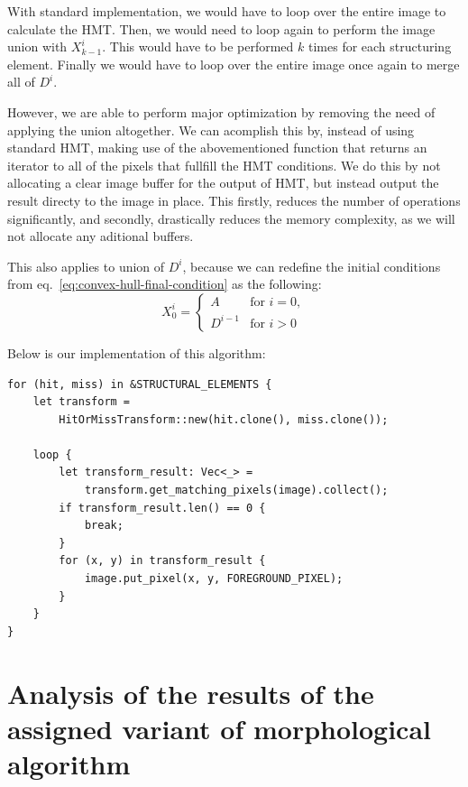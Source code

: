 \documentclass[12pt]{article}
\begin{document}
With standard implementation, we would have to loop over the entire image to calculate the HMT.
Then, we would need to loop again to perform the image union with $X^i_{k-1}$.
This would have to be performed $k$ times for each structuring element.
Finally we would have to loop over the entire image once again to merge all of $D^i$.

However, we are able to perform major optimization by removing the need of applying the union altogether.
We can acomplish this by, instead of using standard HMT, making use of the abovementioned function that returns an iterator to all of the pixels that fullfill the HMT conditions.
We do this by not allocating a clear image buffer for the output of HMT, but instead output the result directy to the image in place.
This firstly, reduces the number of operations significantly, and secondly, drastically reduces the memory complexity, as we will not allocate any aditional buffers.

This also applies to union of $D^i$, because we can redefine the initial conditions from eq.~\eqref{eq:convex-hull-final-condition} as the following:
\begin{equation*}
    X^i_0 =
    \begin{cases}
        A       & \text{for $i = 0$}, \\
        D^{i-1} & \text{for $i > 0$}
    \end{cases}
\end{equation*}

\pagebreak[2]
Below is our implementation of this algorithm:
\begin{lstlisting}
for (hit, miss) in &STRUCTURAL_ELEMENTS {
    let transform = 
        HitOrMissTransform::new(hit.clone(), miss.clone());

    loop {
        let transform_result: Vec<_> = 
            transform.get_matching_pixels(image).collect();
        if transform_result.len() == 0 {
            break;
        }
        for (x, y) in transform_result {
            image.put_pixel(x, y, FOREGROUND_PIXEL);
        }
    }
}
\end{lstlisting}

\section{Analysis of the results of the assigned variant of morphological algorithm}
\end{document}
